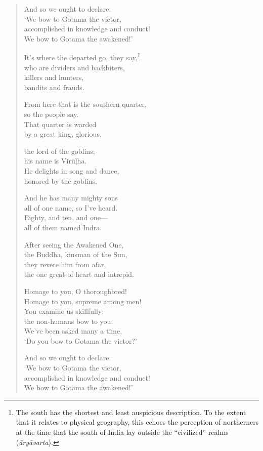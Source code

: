 \documentclass[12pt,openany]{book}%
\begin{document}
\begin{verse}
And so we ought to declare: \\
‘We bow to Gotama the victor, \\
accomplished in knowledge and conduct! \\
We bow to Gotama the awakened!’ 

It’s where the departed go, they say,\footnote{The south has the shortest and least auspicious description. To the extent that it relates to physical geography, this echoes the perception of northerners at the time that the south of India lay outside the “civilized” realms (\textit{\textsanskrit{āryāvarta}}). } \\
who are dividers and backbiters, \\
killers and hunters, \\
bandits and frauds. 

From here that is the southern quarter, \\
so the people say. \\
That quarter is warded \\
by a great king, glorious, 

the lord of the goblins; \\
his name is \textsanskrit{Virūḷha}. \\
He delights in song and dance, \\
honored by the goblins. 

And he has many mighty sons \\
all of one name, so I’ve heard. \\
Eighty, and ten, and one—\\
all of them named Indra. 

After seeing the Awakened One, \\
the Buddha, kinsman of the Sun, \\
they revere him from afar, \\
the one great of heart and intrepid. 

Homage to you, O thoroughbred! \\
Homage to you, supreme among men! \\
You examine us skillfully; \\
the non-humans bow to you. \\
We’ve been asked many a time, \\
‘Do you bow to Gotama the victor?’ 

And so we ought to declare: \\
‘We bow to Gotama the victor, \\
accomplished in knowledge and conduct! \\
We bow to Gotama the awakened!’ 


\end{verse}
\end{document}
